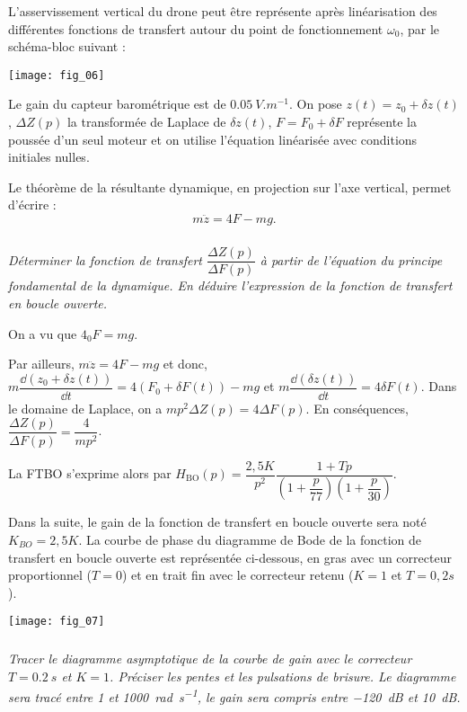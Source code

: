 \begin{multicols}{2}
L'asservissement vertical du drone peut être représente après linéarisation des différentes fonctions de
transfert autour du point de fonctionnement $\omega_0$, par le schéma-bloc suivant :

\begin{center}
\texttt{[image: fig\_06]}
\end{center}



Le gain du capteur barométrique est de $\SI{0,05}{V.m^{-1}}$. On pose $z(t)=z_0+\delta z(t)$, $\Delta Z(p)$ la transformée de Laplace de $\delta z(t)$, $F=F_0 + \delta F$ représente la poussée d'un seul moteur et on utilise l'équation linéarisée avec conditions initiales nulles.

Le théorème de la résultante dynamique, en projection sur l’axe vertical, permet d’écrire :
$$ m\ddot{z} =4F-mg. $$


\subparagraph{}\textit{Déterminer la fonction de transfert $\dfrac{\Delta Z(p)}{\Delta F(p)}$ à partir de l'équation du principe fondamental de la dynamique. En déduire l'expression de la fonction de transfert en boucle ouverte. }
\ifprof
\begin{corrige}
On a vu que  $4 _0F = mg$. 

Par ailleurs, $ m\ddot{z} =4F-mg $ et donc, $ m\dfrac{ \dd\left( z_0+\delta z(t) \right)}{\dd t} = 4\left( F_0 + \delta F(t) \right)-mg$ et
 $ m\dfrac{ \dd\left( \delta z(t) \right)}{\dd t} = 4 \delta F(t) $. Dans le domaine de Laplace, on a 
  $ m p^2  \Delta Z(p) = 4 \Delta F(p) $. En conséquences,  
   $\dfrac{\Delta Z(p)}{\Delta F(p)} = \dfrac{4}{mp^2}$.
   
La FTBO s'exprime alors par $H_{\text{BO}}(p)=\dfrac{2,5 K}{p^2}\dfrac{1+Tp}{\left( 1+\dfrac{p}{77}\right)\left(1+\dfrac{p}{30} \right)}$.
\end{corrige}
\else
\fi

Dans la suite, le gain de la fonction de transfert en boucle ouverte sera noté $K_{BO}=2,5 K$.
La courbe de phase du diagramme de Bode de la fonction de transfert en boucle ouverte est représentée ci-dessous, en gras avec un correcteur proportionnel ($T=0$) et en trait fin avec le correcteur retenu ($K=1$ et $T=0,2s$).


\begin{center}
\texttt{[image: fig\_07]}
\end{center}


\subparagraph{}\textit{Tracer le diagramme asymptotique de la courbe de gain avec le correcteur $T=\SI{0,2}{s}$ et $K=1$.
Préciser les pentes et les pulsations de brisure. Le diagramme sera tracé entre 1 et \SI{1000}{rad.s^{-1}}, le gain sera compris entre \SI{-120}{dB} et \SI{+10}{dB}.}
\ifprof
\begin{corrige}
\end{corrige}
\else
\fi


\end{multicols}
